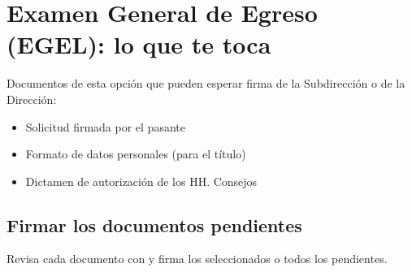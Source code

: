 \section{Examen General de Egreso (EGEL): lo que te toca}
Documentos de esta opción que pueden esperar firma de la Subdirección o de la Dirección:
\begin{itemize}
  \item Solicitud firmada por el pasante
  \item Formato de datos personales (para el título)
  \item Dictamen de autorización de los HH. Consejos
\end{itemize}
\subsection{Firmar los documentos pendientes}
Revisa cada documento con  y firma los seleccionados o todos los pendientes.
